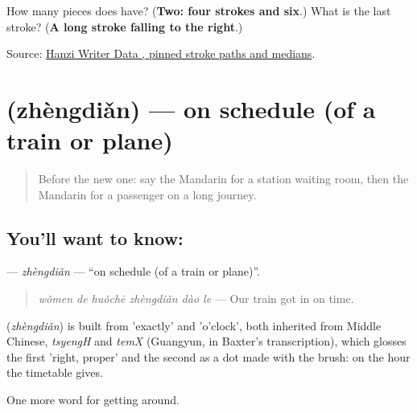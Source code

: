 \begin{tcolorbox}[breakable,colback=teal!4,colframe=teal!35!black,title={Before you move on}]
How many pieces does  have? (\textbf{Two: four strokes and six}.) What is the last stroke? (\textbf{A long stroke falling to the right}.)

Source: \href{https://raw.githubusercontent.com/chanind/hanzi-writer-data/68d10a4b21150cae5e1ebbd223eed289cf32d90c/data/\%E6\%97\%85.json}{Hanzi Writer Data , pinned stroke paths and medians}.
\end{tcolorbox}
\section[\texorpdfstring{\zh{正点} (zhèngdiǎn)}{正点 (zhèngdiǎn)}]{ (zhèngdiǎn) — on schedule (of a train or plane)}

\label{lesson:ZH-C403-zhengdian}



\begin{quote}
Before the new one: say the Mandarin for a station waiting room, then the Mandarin for a passenger on a long journey.
\end{quote}

\subsection*{You'll want to know: }
\textbf{} — \emph{zhèngdiǎn} — \textquotedblleft{}on schedule (of a train or plane)\textquotedblright{}.

\begin{quote}
\textbf{} \emph{wǒmen de huǒchē zhèngdiǎn dào le} — Our train got in on time.
\end{quote}

\begin{cousinweb}
\textbf{} (\emph{zhèngdiǎn}) is built from  'exactly' and  'o'clock', both inherited from Middle Chinese, \emph{tsyengH} and \emph{temX} (Guangyun, in Baxter's transcription), which glosses the first 'right, proper' and the second as a dot made with the brush: on the hour the timetable gives.
\end{cousinweb}

\begin{grammarlens}[title={What you've built}]
One more word for getting around.
\end{grammarlens}


